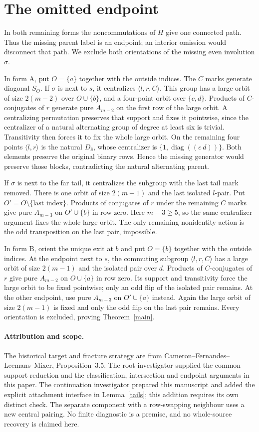 \documentclass[11pt,a4paper]{article}
\newcommand{\gen}[1]{\langle#1\rangle}
\newcommand{\diag}{\operatorname{diag}}
\begin{document}
\section*{The omitted endpoint}
In both remaining forms the noncommutations of $H$ give one
connected path. Thus the missing parent label is an endpoint;
an interior omission would disconnect that path. We exclude
both orientations of the missing even involution $\sigma$.

In form $\mathrm A$, put $O=\{a\}$ together with the outside
indices. The $C$ marks generate diagonal $S_O$. If $\sigma$
is next to $s$, it centralizes $\gen{l,r,C}$. This group has
a large orbit of size $2(m-2)$ over $O\cup\{b\}$, and a
four-point orbit over $\{c,d\}$. Products of $C$-conjugates
of $r$ generate pure $A_{m-2}$ on the first row of the large
orbit. A centralizing permutation preserves that support and
fixes it pointwise, since the centralizer of a natural alternating
group of degree at least six is trivial. Transitivity then
forces it to fix the whole large orbit. On the remaining four
points $\gen{l,r}$ is the natural $D_8$, whose centralizer is
$\{1,\diag((c\ d))\}$. Both elements preserve the original
binary rows. Hence the missing generator would preserve those
blocks, contradicting the natural alternating parent.

If $\sigma$ is next to the far tail, it centralizes the subgroup
with the last tail mark removed. There is one orbit of size
$2(m-1)$ and the last isolated $l$-pair. Put $O'=O\setminus
\{\text{last index}\}$. Products of conjugates of $r$ under
the remaining $C$ marks give pure $A_{m-3}$ on $O'\cup\{b\}$
in row zero. Here $m-3\ge5$, so the same centralizer argument
fixes the whole large orbit. The only remaining nonidentity
action is the odd transposition on the last pair, impossible.

In form $\mathrm B$, orient the unique exit at $b$ and put
$O=\{b\}$ together with the outside indices. At the endpoint
next to $s$, the commuting subgroup $\gen{l,r,C}$ has a large
orbit of size $2(m-1)$ and the isolated pair over $d$. Products
of $C$-conjugates of $r$ give pure $A_{m-2}$ on $O\cup\{a\}$
in row zero. Its support and transitivity force the large orbit
to be fixed pointwise; only an odd flip of the isolated pair
remains. At the other endpoint, use pure $A_{m-3}$ on
$O'\cup\{a\}$ instead. Again the large orbit of size $2(m-1)$
is fixed and only the odd flip on the last pair remains.
Every orientation is excluded, proving Theorem~\ref{main}.

\paragraph{Attribution and scope.}
The historical target and fracture strategy are from
Cameron--Fernandes--Leemans--Mixer, Proposition~3.5. The root
investigator supplied the common support reduction and the
classification, intersection and endpoint arguments in this paper.
The continuation investigator prepared this manuscript and added
the explicit attachment interface in Lemma~\ref{tails}; this
addition requires its own distinct check. The separate component
with a row-swapping neighbour uses a new central pairing. No
finite diagnostic is a premise, and no whole-source recovery is
claimed here.
\end{document}
